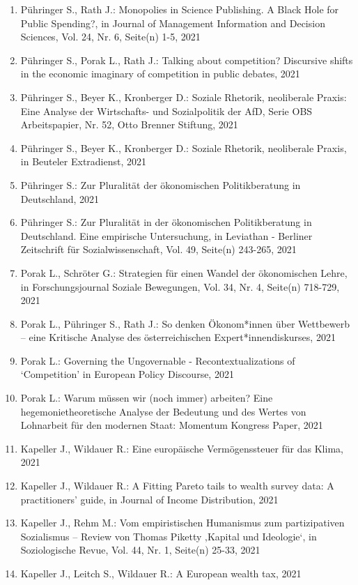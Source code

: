 \begin{enumerate}
	 \item Pühringer S., Rath J.: Monopolies in Science Publishing. A Black Hole for Public Spending?, in Journal of Management Information and Decision Sciences, Vol. 24, Nr. 6, Seite(n) 1-5, 2021
	 \item Pühringer S., Porak L., Rath J.: Talking about competition? Discursive shifts in the economic imaginary of competition in public debates, 2021
	 \item Pühringer S., Beyer K., Kronberger D.: Soziale Rhetorik, neoliberale Praxis: Eine Analyse der Wirtschafts- und Sozialpolitik der AfD, Serie OBS Arbeitspapier, Nr. 52, Otto Brenner Stiftung, 2021
	 \item Pühringer S., Beyer K., Kronberger D.: Soziale Rhetorik, neoliberale Praxis, in Beuteler Extradienst, 2021
	 \item Pühringer S.: Zur Pluralität der ökonomischen Politikberatung in Deutschland, 2021
	 \item Pühringer S.: Zur Pluralität in der ökonomischen Politikberatung in Deutschland. Eine empirische Untersuchung, in Leviathan - Berliner Zeitschrift für Sozialwissenschaft, Vol. 49, Seite(n) 243-265, 2021
	 \item Porak L., Schröter G.: Strategien für einen Wandel der ökonomischen Lehre, in Forschungsjournal Soziale Bewegungen, Vol. 34, Nr. 4, Seite(n) 718-729, 2021
	 \item Porak L., Pühringer S., Rath J.: So denken Ökonom*innen über Wettbewerb – eine Kritische Analyse des österreichischen Expert*innendiskurses, 2021
	 \item Porak L.: Governing the Ungovernable - Recontextualizations of ‘Competition’ in European Policy Discourse, 2021
	 \item Porak L.: Warum müssen wir (noch immer) arbeiten? Eine hegemonietheoretische Analyse der Bedeutung und des Wertes von Lohnarbeit für den modernen Staat: Momentum Kongress Paper, 2021
	 \item Kapeller J., Wildauer R.: Eine europäische Vermögenssteuer für das Klima, 2021
	 \item Kapeller J., Wildauer R.: A Fitting Pareto tails to wealth survey data: A practitioners’ guide, in Journal of Income Distribution, 2021
	 \item Kapeller J., Rehm M.: Vom empiristischen Humanismus zum partizipativen Sozialismus – Review von Thomas Piketty ‚Kapital und Ideologie‘, in Soziologische Revue, Vol. 44, Nr. 1, Seite(n) 25-33, 2021
	 \item Kapeller J., Leitch S., Wildauer R.: A European wealth tax, 2021

\end{enumerate}
